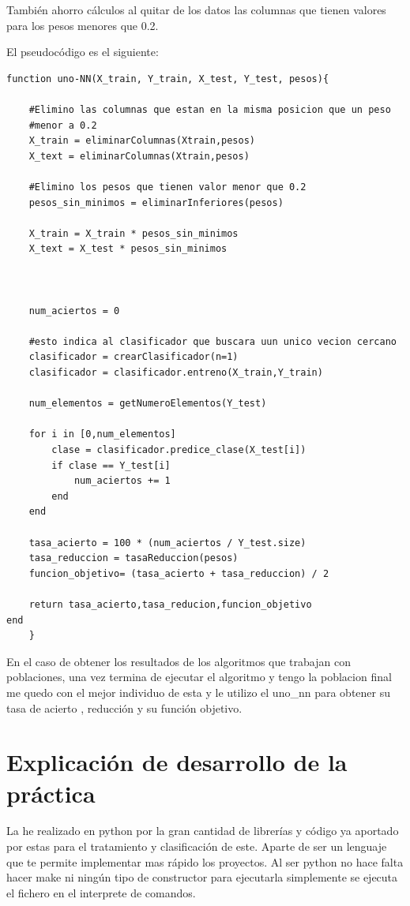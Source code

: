 \documentclass[titlepage]{article}
\begin{document}
	
	También ahorro cálculos al quitar de los datos las columnas que tienen valores para los pesos menores que 0.2. 
	
	El pseudocódigo es el siguiente:

	
	\begin{lstlisting}
function uno-NN(X_train, Y_train, X_test, Y_test, pesos){
	
	#Elimino las columnas que estan en la misma posicion que un peso 
	#menor a 0.2
	X_train = eliminarColumnas(Xtrain,pesos)
	X_text = eliminarColumnas(Xtrain,pesos)
	
	#Elimino los pesos que tienen valor menor que 0.2
	pesos_sin_minimos = eliminarInferiores(pesos)
	
	X_train = X_train * pesos_sin_minimos
	X_text = X_test * pesos_sin_minimos
	
	
	
	num_aciertos = 0
	
	#esto indica al clasificador que buscara uun unico vecion cercano
	clasificador = crearClasificador(n=1)
	clasificador = clasificador.entreno(X_train,Y_train)
	
	num_elementos = getNumeroElementos(Y_test)
	
	for i in [0,num_elementos]
		clase = clasificador.predice_clase(X_test[i])
		if clase == Y_test[i]
			num_aciertos += 1
		end
	end
	
	tasa_acierto = 100 * (num_aciertos / Y_test.size)
	tasa_reduccion = tasaReduccion(pesos)
	funcion_objetivo= (tasa_acierto + tasa_reduccion) / 2
	
	return tasa_acierto,tasa_reducion,funcion_objetivo
end
	}
	\end{lstlisting}
	
	En el caso de obtener los resultados de los algoritmos que trabajan con poblaciones, una vez termina de ejecutar el algoritmo y tengo la poblacion final me quedo con el mejor individuo de esta y le utilizo el uno\_nn para obtener su tasa de acierto , reducción y su función objetivo. 
	
	
	\newpage
	
	\section{Explicación de desarrollo de la práctica}
	La he realizado en python por la gran cantidad de librerías y código ya aportado por estas para el tratamiento y clasificación de este.
	Aparte de ser un lenguaje que te permite implementar mas rápido los proyectos.
	Al ser python no hace falta hacer make ni ningún tipo de constructor para ejecutarla simplemente se ejecuta el fichero en el interprete de comandos.
	
\end{document}
